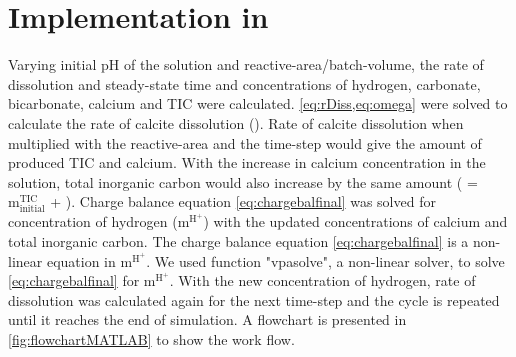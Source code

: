 \section{Implementation in \MATLAB}
Varying initial pH of the solution and reactive-area/batch-volume, the rate of dissolution and steady-state time and 
concentrations of hydrogen, carbonate, bicarbonate, calcium and TIC were calculated. \cref{eq:rDiss,eq:omega} were solved 
to calculate the rate of calcite dissolution (). Rate of calcite dissolution when multiplied with the reactive-area 
and the time-step would give the amount of produced TIC and calcium. With the increase in calcium concentration in the 
solution, total inorganic carbon would also increase by the same amount ( = $\mathrm{m_{initial}^{TIC}}$ + ). 
Charge balance equation \ref{eq:chargebalfinal} was solved for concentration of hydrogen ($\mathrm{m^{H^{+}}}$) with the updated concentrations 
of calcium and total inorganic carbon. The charge balance equation \ref{eq:chargebalfinal} is a non-linear equation in $\mathrm{m^{H^+}}$. 
We used \MATLAB function "vpasolve", a non-linear solver, to solve \cref{eq:chargebalfinal} for $\mathrm{m^{H^+}}$. With the new 
concentration of hydrogen, rate of dissolution was calculated again for the next time-step and the cycle is repeated until it 
reaches the end of simulation. A flowchart is presented in \cref{fig:flowchartMATLAB} to show the work flow. 



